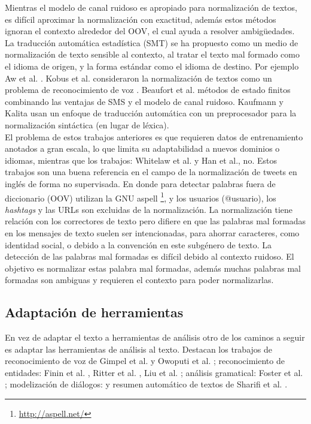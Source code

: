 \documentclass[spanish,12pt, a4paper,twoside]{paper}
\begin{document}
Mientras el modelo de canal ruidoso es apropiado para normalización de textos, es difícil aproximar la normalización con exactitud, además estos métodos ignoran el contexto alrededor del OOV, el cual ayuda a resolver ambigüedades. La traducción automática estadística (SMT) se ha propuesto como un medio de normalización de texto sensible al contexto, al tratar el texto mal formado como el idioma de origen, y la forma estándar como el idioma de destino. Por ejemplo Aw et al. \cite{aw:2006}. Kobus et al. consideraron la normalización de textos como un problema de reconocimiento de voz \cite{kobus:2008}. Beaufort et al. \cite{beaufort:2002} métodos de estado finitos combinando las ventajas de SMS y el modelo de canal ruidoso. Kaufmann y Kalita \cite{kaufmannkalita:2010} usan un enfoque de traducción automática con un preprocesador para la normalización sintáctica (en lugar de léxica).\\

El problema de estos trabajos anteriores es que requieren datos de entrenamiento anotados a gran escala, lo que limita su adaptabilidad a nuevos dominios o idiomas, mientras que los trabajos: Whitelaw et al. \cite{whitelaw:2009} y Han et al.\cite{baldwin:2011}, no. Estos trabajos son una buena referencia en el campo de la normalización de tweets en inglés de forma no supervisada. En donde para detectar palabras fuera de diccionario (OOV) utilizan la GNU aspell \footnote{\url{http://aspell.net/}}, y los usuarios (@usuario), los \textit{hashtags} y las URLs son excluidas de la normalización. La normalización tiene relación con los correctores de texto \cite{peterson:1980} pero difiere en que las palabras mal formadas en los mensajes de texto suelen ser intencionadas, para ahorrar caracteres, como identidad social, o debido a la convención en este subgénero de texto. La detección de las palabras mal formadas es difícil debido al contexto ruidoso. El objetivo es normalizar estas palabra mal formadas, además muchas palabras mal formadas son ambiguas y requieren el contexto para poder normalizarlas.

\subsection{Adaptación de herramientas}\label{sec:adaptaciondeherramientas}
En vez de adaptar el texto a herramientas de análisis otro de los caminos a seguir es adaptar las herramientas de análisis al texto. Destacan los trabajos de reconocimiento de voz de Gimpel et al. \cite{gimpel:2011} y Owoputi et al. \cite{owoputi:2013}; reconocimiento de entidades: Finin et al. \cite{finin:2010}, Ritter et al. \cite{ritter:2011}, Liu et al. \cite{liu:2011}; análisis gramatical: Foster et al. \cite{foster:2011}; modelización de diálogos: \cite{ritter:2010} y resumen automático de textos de Sharifi et al. \cite{sharifi:2010}.\\
\end{document}
